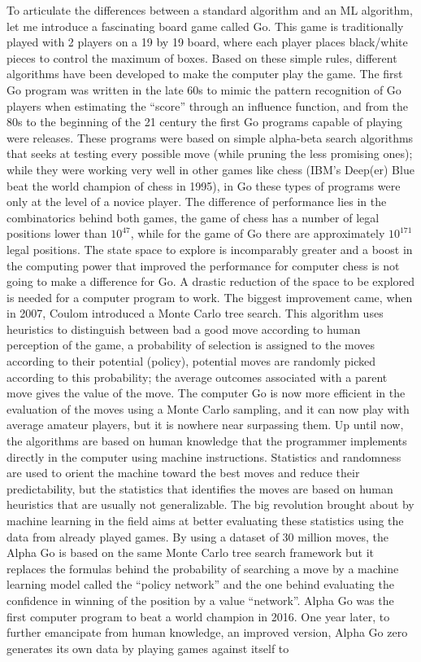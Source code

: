 \documentclass[main]{subfiles}
\begin{document}
To articulate the differences between a standard algorithm and an ML algorithm, let me introduce a fascinating board game called Go. This game is traditionally played with 2 players on a 19 by 19 board, where each player places black/white pieces to control the maximum of boxes. Based on these simple rules, different algorithms have been developed to make the computer play the game. The first Go program was written in the late 60s to mimic the pattern recognition of Go players when estimating the ``score'' through an influence function,\autocite{zobrist1970feature} and from the 80s to the beginning of the 21 century the first Go programs capable of playing were releases. These programs were based on simple alpha-beta search algorithms that seeks at testing every possible move (while pruning the less promising ones); while they were working very well in other games like chess (IBM's Deep(er) Blue beat the world champion of chess in 1995), in Go these types of programs were only at the level of a novice player. The difference of performance lies in the combinatorics behind both games, the game of chess has a number of legal positions lower than $10^{47}$,\autocite{website_labelle} while for the game of Go there are approximately $10^{171}$ legal positions.\autocite{Tromp_2007,github_tromp_go} The state space to explore is incomparably greater and a boost in the computing power that improved the performance for computer chess is not going to make a difference for Go. A drastic reduction of the space to be explored is needed for a computer program to work. The biggest improvement came, when in 2007, Coulom introduced a Monte Carlo tree search.\autocite{Coulom_2007} This algorithm uses heuristics to distinguish between bad a good move according to human perception of the game, a probability of selection is assigned to the moves according to their potential (policy), potential moves are randomly picked according to this probability; the average outcomes associated with a parent move gives the value of the move. The computer Go is now more efficient in the evaluation of the moves using a Monte Carlo sampling, and it can now play with average amateur players, but it is nowhere near surpassing them. Up until now, the algorithms are based on human knowledge that the programmer implements directly in the computer using machine instructions. Statistics and randomness are used to orient the machine toward the best moves and reduce their predictability, but the statistics that identifies the moves are based on human heuristics that are usually not generalizable. The big revolution brought about by machine learning in the field aims at better evaluating these statistics using the data from already played games. By using a dataset of 30 million moves, the Alpha Go is based on the same Monte Carlo tree search framework but it replaces the formulas behind the probability of searching a move by a machine learning model called the ``policy network'' and the one behind evaluating the confidence in winning of the position by a value ``network''.\autocite{Silver_2016} Alpha Go was the first computer program to beat a world champion in 2016. One year later, to further emancipate from human knowledge, an improved version, Alpha Go zero generates its own data by playing games against itself to 
\end{document}
